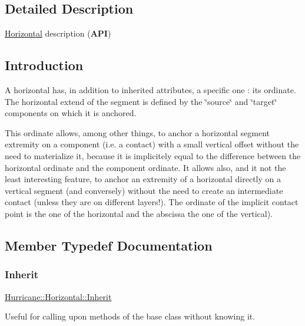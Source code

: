 \subsection{Detailed Description}
\mbox{\hyperlink{classHurricane_1_1Horizontal}{Horizontal}} description ({\bfseries A\+PI}) 

\hypertarget{classHurricane_1_1Horizontal_secHorizontalIntro}{}\subsection{Introduction}\label{classHurricane_1_1Horizontal_secHorizontalIntro}
A horizontal has, in addition to inherited attributes, a specific one \+: its ordinate. The horizontal extend of the segment is defined by the \char`\"{}source\char`\"{} and \char`\"{}target\char`\"{} components on which it is anchored.

This ordinate allows, among other things, to anchor a horizontal segment extremity on a component (i.\+e. a contact) with a small vertical offset without the need to materialize it, because it is implicitely equal to the difference between the horizontal ordinate and the component ordinate. It allows also, and it not the least interesting feature, to anchor an extremity of a horizontal directly on a vertical segment (and conversely) without the need to create an intermediate contact (unless they are on different layers!). The ordinate of the implicit contact point is the one of the horizontal and the abscissa the one of the vertical). 

\subsection{Member Typedef Documentation}
\mbox{\label{classHurricane_1_1Horizontal_a43266e3530dc5872f4eabf16eba86bdb}} 
\subsubsection{\texorpdfstring{Inherit}{Inherit}}
{\footnotesize\ttfamily \mbox{\hyperlink{classHurricane_1_1Horizontal_a43266e3530dc5872f4eabf16eba86bdb}{Hurricane\+::\+Horizontal\+::\+Inherit}}}

Useful for calling upon methods of the base class without knowing it. 

